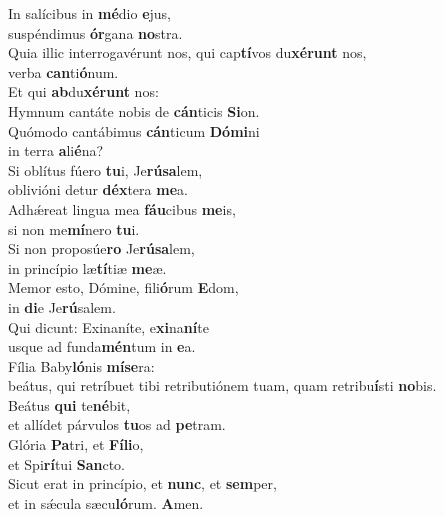 \evenverse In salícibus in \textbf{mé}dio \textbf{e}jus,~\*\\
\evenverse suspéndimus \textbf{ór}gana \textbf{no}stra.\\
\oddverse Quia illic interrogavérunt nos, qui cap\textbf{tí}vos du\textbf{xé}\textbf{runt} nos,~\*\\
\oddverse verba \textbf{can}ti\textbf{ó}num.\\
\evenverse Et qui \textbf{ab}du\textbf{xé}\textbf{runt} nos:~\*\\
\evenverse Hymnum cantáte nobis de \textbf{cán}ticis \textbf{Si}on.\\
\oddverse Quómodo cantábimus \textbf{cán}ticum \textbf{Dó}\textbf{mi}ni~\*\\
\oddverse in terra \textbf{a}li\textbf{é}na?\\
\evenverse Si oblítus fúero \textbf{tu}i, Je\textbf{rú}\textbf{sa}lem,~\*\\
\evenverse oblivióni detur \textbf{déx}tera \textbf{me}a.\\
\oddverse Adhǽreat lingua mea \textbf{fáu}cibus \textbf{me}is,~\*\\
\oddverse si non me\textbf{mí}nero \textbf{tu}i.\\
\evenverse Si non proposúe\textbf{ro} Je\textbf{rú}\textbf{sa}lem,~\*\\
\evenverse in princípio læ\textbf{tí}tiæ \textbf{me}æ.\\
\oddverse Memor esto, Dómine, fili\textbf{ó}rum \textbf{E}dom,~\*\\
\oddverse in \textbf{di}e Je\textbf{rú}salem.\\
\evenverse Qui dicunt: Exinaníte, e\textbf{xi}na\textbf{ní}te~\*\\
\evenverse usque ad funda\textbf{mén}tum in \textbf{e}a.\\
\oddverse Fília Baby\textbf{ló}nis \textbf{mí}\textbf{se}ra:~\*\\
\oddverse beátus, qui retríbuet tibi retributiónem tuam, quam retribu\textbf{í}sti \textbf{no}bis.\\
\evenverse Beátus \textbf{qui} te\textbf{né}bit,~\*\\
\evenverse et allídet párvulos \textbf{tu}os ad \textbf{pe}tram.\\
\oddverse Glória \textbf{Pa}tri, et \textbf{Fí}\textbf{li}o,~\*\\
\oddverse et Spi\textbf{rí}tui \textbf{San}cto.\\
\evenverse Sicut erat in princípio, et \textbf{nunc}, et \textbf{sem}per,~\*\\
\evenverse et in sǽcula sæcu\textbf{ló}rum. \textbf{A}men.\\

